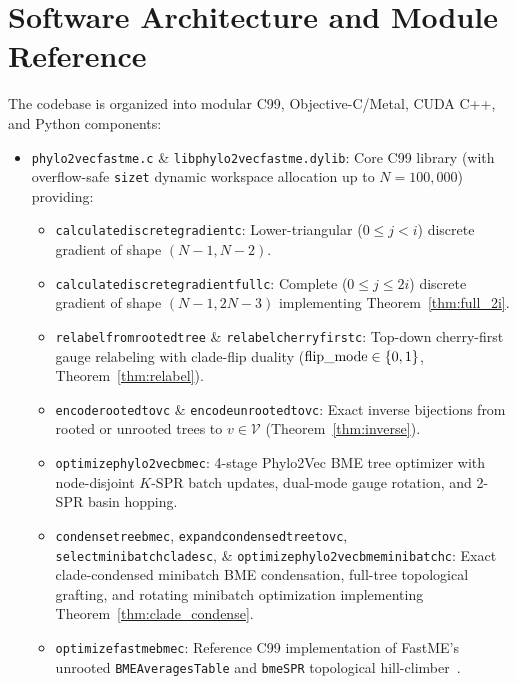 \documentclass[11pt,a4paper]{article}
\makeatletter
\DeclareRobustCommand{\_}{\ifmmode\nfss@text{\textunderscore}\else\textunderscore\allowbreak\fi}
\theoremstyle{definition}
\makeatother
\begin{document}
\section{Software Architecture and Module Reference}
\label{sec:software}

The codebase is organized into modular C99, Objective-C/Metal, CUDA C++, and Python components:
\begin{itemize}
    \item \texttt{phylo2vec\_fastme.c} \& \texttt{libphylo2vec\_fastme.dylib}: Core C99 library (with overflow-safe \texttt{size\_t} dynamic workspace allocation up to $N = 100{,}000$) providing:
    \begin{itemize}
        \item \texttt{calculate\_discrete\_gradient\_c}: Lower-triangular ($0 \le j < i$) discrete gradient of shape $(N-1, N-2)$.
        \item \texttt{calculate\_discrete\_gradient\_full\_c}: Complete ($0 \le j \le 2i$) discrete gradient of shape $(N-1, 2N-3)$ implementing Theorem~\ref{thm:full_2i}.
        \item \texttt{relabel\_from\_rooted\_tree} \& \texttt{relabel\_cherry\_first\_c}: Top-down cherry-first gauge relabeling with clade-flip duality ($\text{flip\_mode} \in \{0, 1\}$, Theorem~\ref{thm:relabel}).
        \item \texttt{encode\_rooted\_to\_v\_c} \& \texttt{encode\_unrooted\_to\_v\_c}: Exact inverse bijections from rooted or unrooted trees to $v \in \mathcal{V}$ (Theorem~\ref{thm:inverse}).
        \item \texttt{optimize\_phylo2vec\_bme\_c}: 4-stage Phylo2Vec BME tree optimizer with node-disjoint $K$-SPR batch updates, dual-mode gauge rotation, and 2-SPR basin hopping.
        \item \texttt{condense\_tree\_bme\_c}, \texttt{expand\_condensed\_tree\_to\_v\_c}, \texttt{select\_minibatch\_clades\_c}, \& \texttt{optimize\_phylo2vec\_bme\_minibatch\_c}: Exact clade-condensed minibatch BME condensation, full-tree topological grafting, and rotating minibatch optimization implementing Theorem~\ref{thm:clade_condense}.
        \item \texttt{optimize\_fastme\_bme\_c}: Reference C99 implementation of FastME's unrooted \texttt{BMEAveragesTable} and \texttt{bmeSPR} topological hill-climber~\cite{desper2002fast,lefort2015fastme}.

\end{itemize}
\end{itemize}
\end{document}
